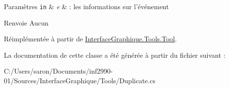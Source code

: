 \begin{DoxyParams}[1]{Paramètres}
\mbox{\tt in}  & {\em e} & \-: les informations sur l'événement\\
\hline
\end{DoxyParams}
\begin{DoxyReturn}{Renvoie}
Aucun 
\end{DoxyReturn}


Réimplémentée à partir de \hyperlink{class_interface_graphique_1_1_tools_1_1_tool_aedd1c93f96ee602475b7cbc3c9c99baa}{Interface\-Graphique.\-Tools.\-Tool}.



La documentation de cette classe a été générée à partir du fichier suivant \-:\begin{DoxyCompactItemize}
\item 
C\-:/\-Users/saron/\-Documents/inf2990-\/01/\-Sources/\-Interface\-Graphique/\-Tools/Duplicate.\-cs\end{DoxyCompactItemize}
